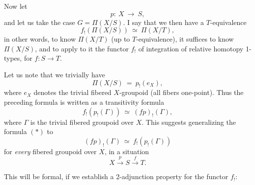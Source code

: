 \documentclass[11pt]{article}
\newcommand{\msp}[1]{\marginpar{\footnotesize [#1]}}
\begin{document}
Now let
\[ p :\ X \ \longrightarrow\ S, \]
and let us take the case $G = \Pi(X/S)$. I say that we then have a $T$-equivalence
\[ \boxed{\ f_!(\Pi(X/S)) \ \simeq\ \Pi(X/T),\ } \tag*{$(*)$} \]
in other words, to know $\Pi(X/T)$ (up to $T$-equivalence), it suffices to know $\Pi(X/S)$, and to apply to it the functor $f_!$ of integration of relative homotopy 1-types, for $f : S \longrightarrow T$.

Let us note that we trivially have
\[ \Pi(X/S) \ =\ p_!(e_X), \]
where $e_X$ denotes the trivial fibered $X$-groupoid (all fibers one-point). Thus the preceding formula is written as a transitivity formula
\[ f_!(p_!(\Gamma)) \ \simeq\ (fp)_!(\Gamma), \]
\msp{page 4}
where $\Gamma$ is the trivial fibered groupoid over $X$. This suggests generalizing the formula $(*)$ to
\[ \boxed{\ (fp)_!(\Gamma) \ \simeq\ f_!(p_!(\Gamma))\ } \]
for \textit{every} fibered groupoid over $X$, in a situation
\[ X \xrightarrow{\ p\ } S \xrightarrow{\ f\ } T. \]

This will be formal, if we establish a 2-adjunction property for the functor $f_!$:
\end{document}
